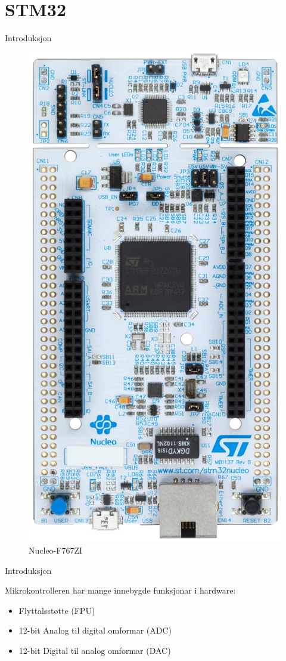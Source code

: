 \section{STM32}

\begin{frame}{Introduksjon}
	
	\begin{figure}
		\centering
		\includegraphics[width=0.5\linewidth,angle=90]{img/nucleo-f767zi}
		\caption{Nucleo-F767ZI}
		\label{fig:nucleo-f767zi}
	\end{figure}
	
	
\end{frame}


\begin{frame}{Introduksjon}

Mikrokontrolleren har mange innebygde funksjonar i hardware:

\begin{itemize}
	\item Flyttalsstøtte (FPU)
	\item 12-bit Analog til digital omformar (ADC)
	\item 12-bit Digital til analog omformar (DAC)
\end{itemize}

	
\end{frame}

